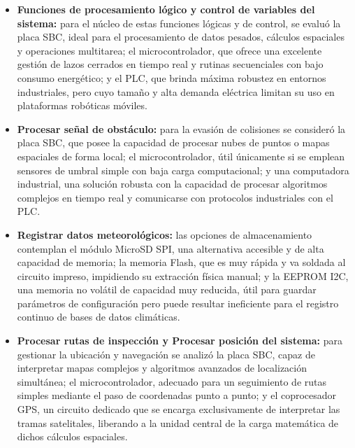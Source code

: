 \documentclass[../../General.tex]{subfiles}
\begin{document}
\begin{itemize}
	\item \textbf{Funciones de procesamiento lógico y control de variables del sistema:} para el núcleo de estas funciones lógicas y de control, se evaluó la placa SBC, ideal para el procesamiento de datos pesados, cálculos espaciales y operaciones multitarea; el microcontrolador, que ofrece una excelente gestión de lazos cerrados en tiempo real y rutinas secuenciales con bajo consumo energético; y el PLC, que brinda máxima robustez en entornos industriales, pero cuyo tamaño y alta demanda eléctrica limitan su uso en plataformas robóticas móviles.
	
	\item \textbf{Procesar señal de obstáculo:} para la evasión de colisiones se consideró la placa SBC, que posee la capacidad de procesar nubes de puntos o mapas espaciales de forma local; el microcontrolador, útil únicamente si se emplean sensores de umbral simple con baja carga computacional; y una computadora industrial, una solución robusta con la capacidad de procesar algoritmos complejos en tiempo real y comunicarse con protocolos industriales con el PLC.
	
	\item \textbf{Registrar datos meteorológicos:} las opciones de almacenamiento contemplan el módulo MicroSD SPI, una alternativa accesible y de alta capacidad de memoria; la memoria Flash, que es muy rápida y va soldada al circuito impreso, impidiendo su extracción física manual; y la EEPROM I2C, una memoria no volátil de capacidad muy reducida, útil para guardar parámetros de configuración pero puede resultar ineficiente para el registro continuo de bases de datos climáticas.
	
	\item \textbf{Procesar rutas de inspección y Procesar posición del sistema:} para gestionar la ubicación y navegación se analizó la placa SBC, capaz de interpretar mapas complejos y algoritmos avanzados de localización simultánea; el microcontrolador, adecuado para un seguimiento de rutas simples mediante el paso de coordenadas punto a punto; y el coprocesador GPS, un circuito dedicado que se encarga exclusivamente de interpretar las tramas satelitales, liberando a la unidad central de la carga matemática de dichos cálculos espaciales.
\end{itemize}
\end{document}
